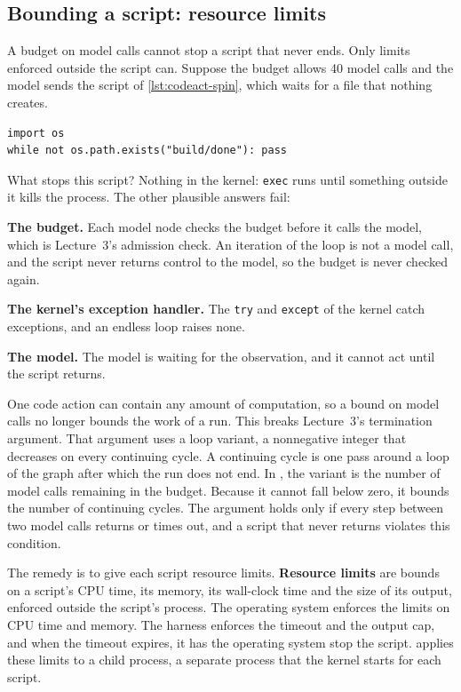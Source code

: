 \subsection{Bounding a script: resource limits}
\label{sec:codeact-limits}

A budget on model calls cannot stop a script that never ends. Only limits enforced outside the
script can. Suppose the budget allows 40 model calls and the model sends the script of
\cref{lst:codeact-spin}, which waits for a file that nothing creates.

\begin{lstlisting}[basicstyle=\ttfamily\footnotesize, columns=fixed, basewidth=0.525em, caption={Illustrative script that never ends, because nothing creates the file it waits for.}, label=lst:codeact-spin]
import os
while not os.path.exists("build/done"): pass
\end{lstlisting}

What stops this script? Nothing in the kernel: \texttt{exec} runs until something outside it kills
the process. The other plausible answers fail:
\bi
\item \textbf{The budget.} Each model node checks the budget before it calls the model, which is
Lecture~3's admission check. An iteration of the loop is not a model call, and the script never
returns control to the model, so the budget is never checked again.
\item \textbf{The kernel's exception handler.} The \texttt{try} and \texttt{except} of the kernel
catch exceptions, and an endless loop raises none.
\item \textbf{The model.} The model is waiting for the observation, and it cannot act until the
script returns.
\ei

One code action can contain any amount of computation, so a bound on model calls no longer bounds
the work of a run. This breaks Lecture~3's termination argument. That argument uses a loop variant,
a nonnegative integer that decreases on every continuing cycle. A continuing cycle is one pass
around a loop of the graph after which the run does not end. In \msa{}, the variant is the number of model calls remaining in
the budget. Because it cannot fall below zero, it bounds the number of continuing cycles. The argument holds only if every step between two
model calls returns or times out, and a script that never returns violates this condition.

The remedy is to give each script resource limits. \textbf{Resource limits} are bounds on a
script's CPU time, its memory, its wall-clock time and the size of its output, enforced outside the
script's process. The operating system enforces the limits on CPU time and memory. The harness
enforces the timeout and the output cap, and when the timeout expires, it has the operating system
stop the script.
 applies these limits to a child process, a separate process that the
kernel starts for each script.

